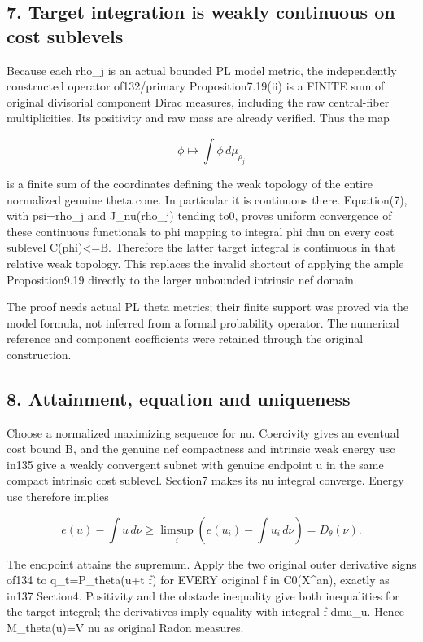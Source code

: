 \documentclass[
  10pt,
]{article}
\begin{document}
\subsection{7. Target integration is weakly continuous on cost
sublevels}\label{target-integration-is-weakly-continuous-on-cost-sublevels}

Because each rho\_j is an actual bounded PL model metric, the
independently constructed operator of132/primary Proposition7.19(ii) is
a FINITE sum of original divisorial component Dirac measures, including
the raw central-fiber multiplicities. Its positivity and raw mass are
already verified. Thus the map

\[\phi\longmapsto\int\phi\,d\mu_{\rho_j}\]

is a finite sum of the coordinates defining the weak topology of the
entire normalized genuine theta cone. In particular it is continuous
there. Equation(7), with psi=rho\_j and J\_nu(rho\_j) tending to0,
proves uniform convergence of these continuous functionals to phi
mapping to integral phi dnu on every cost sublevel C(phi)\textless=B.
Therefore the latter target integral is continuous in that relative weak
topology. This replaces the invalid shortcut of applying the ample
Proposition9.19 directly to the larger unbounded intrinsic nef domain.

The proof needs actual PL theta metrics; their finite support was proved
via the model formula, not inferred from a formal probability operator.
The numerical reference and component coefficients were retained through
the original construction.

\subsection{8. Attainment, equation and
uniqueness}\label{attainment-equation-and-uniqueness}

Choose a normalized maximizing sequence for nu. Coercivity gives an
eventual cost bound B, and the genuine nef compactness and intrinsic
weak energy usc in135 give a weakly convergent subnet with genuine
endpoint u in the same compact intrinsic cost sublevel. Section7 makes
its nu integral converge. Energy usc therefore implies

\[e(u)-\int u\,d\nu\geq\limsup_i\left(e(u_i)-\int u_i\,d\nu\right)=D_\theta(\nu).\]

The endpoint attains the supremum. Apply the two original outer
derivative signs of134 to q\_t=P\_theta(u+t f) for EVERY original f in
C0(X\^{}an), exactly as in137 Section4. Positivity and the obstacle
inequality give both inequalities for the target integral; the
derivatives imply equality with integral f dmu\_u. Hence M\_theta(u)=V
nu as original Radon measures.
\end{document}
